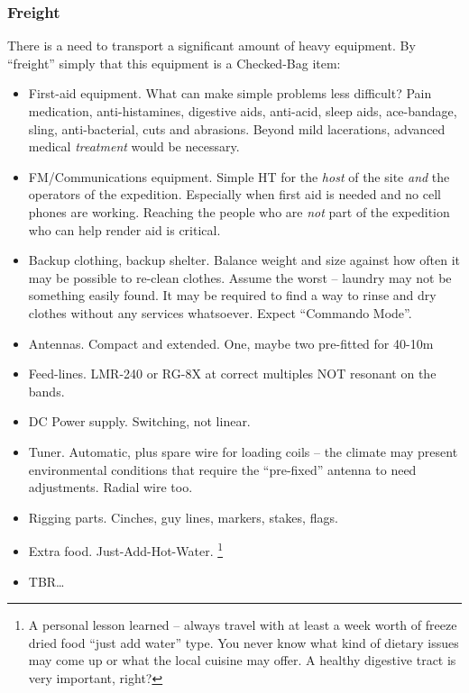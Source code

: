 \documentclass[11pt]{article}
\begin{document}
\subsubsection{Freight}

There is a need to transport a significant amount of heavy
equipment.  By ``freight'' simply that this equipment is 
a Checked-Bag item:

\begin{itemize}
\item First-aid equipment.  What can make simple problems less difficult?
Pain medication, anti-histamines, digestive aids,  anti-acid,
sleep aids, ace-bandage, sling,
anti-bacterial, cuts and abrasions.  Beyond mild lacerations, advanced
medical {\textit{treatment}} would be necessary.
\item FM/Communications equipment.  Simple HT for the {\textit{host}}
of the site {\textit{and}} the operators of the expedition.  Especially
when first aid is needed and no cell phones are working.  Reaching
the people who are {\textit{not}} part of the expedition who can help
render aid is critical.
\item Backup clothing, backup shelter.  Balance weight and size against
how often it may be possible to re-clean clothes.  Assume the worst --
laundry may not be something easily found.  It may be required to 
find a way to rinse and dry clothes without any services whatsoever.  Expect
``Commando Mode''.
\item Antennas. Compact and extended.  One, maybe two pre-fitted for 40-10m
\item Feed-lines. LMR-240 or RG-8X at correct multiples NOT resonant on
the bands.
\item DC Power supply. Switching, not linear.
\item Tuner. Automatic, plus spare wire for loading coils -- the climate
may present environmental conditions that require the ``pre-fixed'' antenna
to need adjustments.  Radial wire too.
\item Rigging parts. Cinches, guy lines, markers, stakes, flags.
\item Extra food. Just-Add-Hot-Water. \footnote{A personal lesson learned -- always travel with
at least a week worth of freeze dried food ``just add water'' type.
You never know what kind of dietary issues may come up or what
the local cuisine may offer.  A healthy digestive tract is very important,
right?}
\item TBR\ldots
\end{itemize}
\end{document}
